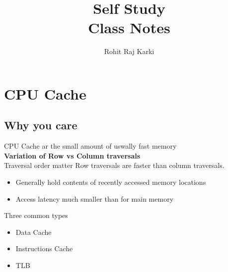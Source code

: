 \documentclass{report}
\title{\Huge{Self Study}\\Class Notes}
\author{\huge{Rohit Raj Karki}}
\date{}
\begin{document}
\maketitle
\newpage%
\tableofcontents
\pagebreak

\chapter{CPU Cache}
\section{Why you care}

CPU Cache ar the small amount of uswally fast memory \\
\textbf{Variation of Row vs Column traversals} \\
Traversal order matter
Row traversals are faster than column traversals.\\
\begin{itemize}
    \item Generally hold contents of recently accessed memory locations
    \item Access latency much smaller than for main memory
\end{itemize}
Three common types\\
\begin{itemize}
    \item Data Cache
    \item Instructions Cache
    \item TLB
\end{itemize}
\end{document}
